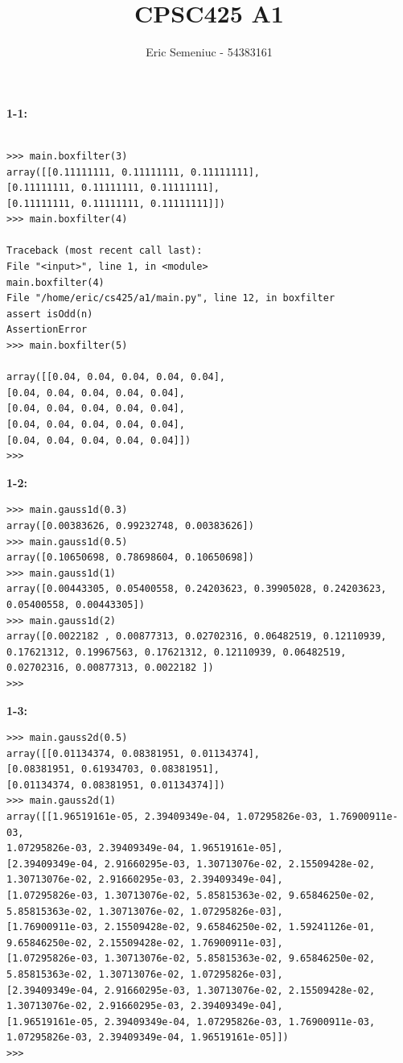 \documentclass[]{article}
\title{CPSC425 A1}
\author{Eric Semeniuc - 54383161}
\begin{document}
\maketitle


\textbf{1-1:}
\begin{verbatim}

>>> main.boxfilter(3)
array([[0.11111111, 0.11111111, 0.11111111],
[0.11111111, 0.11111111, 0.11111111],
[0.11111111, 0.11111111, 0.11111111]])
>>> main.boxfilter(4)

Traceback (most recent call last):
File "<input>", line 1, in <module>
main.boxfilter(4)
File "/home/eric/cs425/a1/main.py", line 12, in boxfilter
assert isOdd(n)
AssertionError
>>> main.boxfilter(5)

array([[0.04, 0.04, 0.04, 0.04, 0.04],
[0.04, 0.04, 0.04, 0.04, 0.04],
[0.04, 0.04, 0.04, 0.04, 0.04],
[0.04, 0.04, 0.04, 0.04, 0.04],
[0.04, 0.04, 0.04, 0.04, 0.04]])
>>> 
\end{verbatim}


\textbf{1-2:}
\begin{verbatim}
>>> main.gauss1d(0.3)
array([0.00383626, 0.99232748, 0.00383626])
>>> main.gauss1d(0.5)
array([0.10650698, 0.78698604, 0.10650698])
>>> main.gauss1d(1)
array([0.00443305, 0.05400558, 0.24203623, 0.39905028, 0.24203623,
0.05400558, 0.00443305])
>>> main.gauss1d(2)
array([0.0022182 , 0.00877313, 0.02702316, 0.06482519, 0.12110939,
0.17621312, 0.19967563, 0.17621312, 0.12110939, 0.06482519,
0.02702316, 0.00877313, 0.0022182 ])
>>> 
\end{verbatim}


\textbf{1-3:}
\begin{verbatim}
>>> main.gauss2d(0.5)
array([[0.01134374, 0.08381951, 0.01134374],
[0.08381951, 0.61934703, 0.08381951],
[0.01134374, 0.08381951, 0.01134374]])
>>> main.gauss2d(1)
array([[1.96519161e-05, 2.39409349e-04, 1.07295826e-03, 1.76900911e-03,
1.07295826e-03, 2.39409349e-04, 1.96519161e-05],
[2.39409349e-04, 2.91660295e-03, 1.30713076e-02, 2.15509428e-02,
1.30713076e-02, 2.91660295e-03, 2.39409349e-04],
[1.07295826e-03, 1.30713076e-02, 5.85815363e-02, 9.65846250e-02,
5.85815363e-02, 1.30713076e-02, 1.07295826e-03],
[1.76900911e-03, 2.15509428e-02, 9.65846250e-02, 1.59241126e-01,
9.65846250e-02, 2.15509428e-02, 1.76900911e-03],
[1.07295826e-03, 1.30713076e-02, 5.85815363e-02, 9.65846250e-02,
5.85815363e-02, 1.30713076e-02, 1.07295826e-03],
[2.39409349e-04, 2.91660295e-03, 1.30713076e-02, 2.15509428e-02,
1.30713076e-02, 2.91660295e-03, 2.39409349e-04],
[1.96519161e-05, 2.39409349e-04, 1.07295826e-03, 1.76900911e-03,
1.07295826e-03, 2.39409349e-04, 1.96519161e-05]])
>>> 
\end{verbatim}
\end{document}
